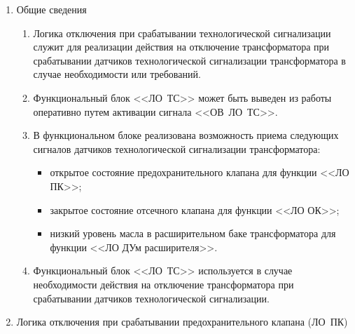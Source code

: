 \documentclass[a4paper, 12pt,table, hidelinks, DIV=calc]{extarticle} %
\begin{document}
\begin{enumerate}[label=\arabic{section}.\arabic{subsection}.\arabic{enumi}, labelsep=4pt, leftmargin=0pt, itemindent=57pt, itemsep=0pt, parsep=5pt] %

\item Общие сведения

\begin{enumerate}[label=\arabic{section}.\arabic{subsection}.\arabic{enumi}.\arabic*, labelsep=4pt, leftmargin=0em, itemindent=65pt, parsep=0pt]

\item
Логика отключения при срабатывании технологической сигнализации служит для реализации действия на отключение трансформатора при срабатывании датчиков технологической сигнализации трансформатора в случае необходимости или требований.
\item
Функциональный блок <<ЛО~ТС>> может быть выведен из работы оперативно путем активации сигнала <<ОВ~ЛО~ТС>>.
\item
В функциональном блоке реализована возможность приема следующих сигналов датчиков технологической сигнализации трансформатора:
\begin{itemize}
\item открытое состояние предохранительного клапана для функции <<ЛО ПК>>;
\item закрытое состояние отсечного клапана для функции <<ЛО ОК>>;
\item низкий уровень масла в расширительном баке трансформатора для функции <<ЛО ДУм расширителя>>.
\end{itemize}
\item
Функциональный блок <<ЛО~ТС>> используется в случае необходимости действия на отключение трансформатора при срабатывании датчиков технологической сигнализации.

\end{enumerate}

\item Логика отключения при срабатывании предохранительного клапана (ЛО~ПК)

\begin{enumerate}[label=\arabic{section}.\arabic{subsection}.\arabic{enumi}.\arabic*, labelsep=4pt, leftmargin=0em, itemindent=65pt, parsep=0pt]


\end{enumerate}
\end{enumerate}
\end{document}
